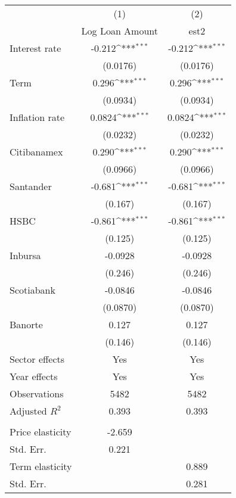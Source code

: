{
\def\sym#1{\ifmmode^{#1}\else\(^{#1}\)\fi}
\begin{tabular}{l*{2}{c}}
\hline\hline
                &\multicolumn{1}{c}{(1)}&\multicolumn{1}{c}{(2)}\\
                &\multicolumn{1}{c}{Log Loan Amount}&\multicolumn{1}{c}{est2}\\
\hline
Interest rate   &   -0.212\sym{***}&   -0.212\sym{***}\\
                & (0.0176)         & (0.0176)         \\
Term            &    0.296\sym{***}&    0.296\sym{***}\\
                & (0.0934)         & (0.0934)         \\
Inflation rate  &   0.0824\sym{***}&   0.0824\sym{***}\\
                & (0.0232)         & (0.0232)         \\
Citibanamex     &    0.290\sym{***}&    0.290\sym{***}\\
                & (0.0966)         & (0.0966)         \\
Santander       &   -0.681\sym{***}&   -0.681\sym{***}\\
                &  (0.167)         &  (0.167)         \\
HSBC            &   -0.861\sym{***}&   -0.861\sym{***}\\
                &  (0.125)         &  (0.125)         \\
Inbursa         &  -0.0928         &  -0.0928         \\
                &  (0.246)         &  (0.246)         \\
Scotiabank      &  -0.0846         &  -0.0846         \\
                & (0.0870)         & (0.0870)         \\
Banorte         &    0.127         &    0.127         \\
                &  (0.146)         &  (0.146)         \\
Sector effects  &      Yes         &      Yes         \\
Year effects    &      Yes         &      Yes         \\
\hline
Observations    &     5482         &     5482         \\
Adjusted \(R^{2}\)&    0.393         &    0.393         \\
\hline          &                  &                  \\
\hspace{5mm} Price elasticity&   -2.659         &                  \\
\hspace{5mm} Std. Err.&    0.221         &                  \\
\hspace{5mm} Term elasticity&                  &    0.889         \\
\hspace{5mm} Std. Err.&                  &    0.281         \\
\hline\hline
\end{tabular}
}
